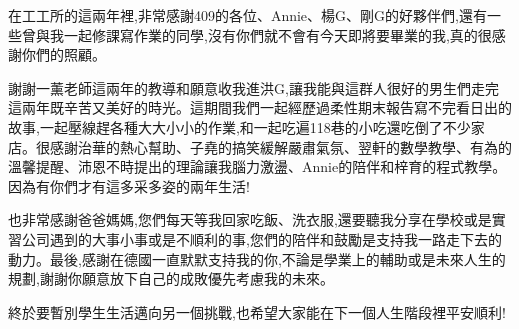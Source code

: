 \begin{acknowledgementszh}
在工工所的這兩年裡,非常感謝409的各位、Annie、楊G、剛G的好夥伴們,還有一些曾與我一起修課寫作業的同學,沒有你們就不會有今天即將要畢業的我,真的很感謝你們的照顧。

謝謝一薰老師這兩年的教導和願意收我進洪G,讓我能與這群人很好的男生們走完這兩年既辛苦又美好的時光。這期間我們一起經歷過柔性期末報告寫不完看日出的故事,一起壓線趕各種大大小小的作業,和一起吃遍118巷的小吃還吃倒了不少家店。很感謝治華的熱心幫助、子堯的搞笑緩解嚴肅氣氛、翌軒的數學教學、有為的溫馨提醒、沛恩不時提出的理論讓我腦力激盪、Annie的陪伴和梓育的程式教學。因為有你們才有這多采多姿的兩年生活!

也非常感謝爸爸媽媽,您們每天等我回家吃飯、洗衣服,還要聽我分享在學校或是實習公司遇到的大事小事或是不順利的事,您們的陪伴和鼓勵是支持我一路走下去的動力。最後,感謝在德國一直默默支持我的你,不論是學業上的輔助或是未來人生的規劃,謝謝你願意放下自己的成敗優先考慮我的未來。

終於要暫別學生生活邁向另一個挑戰,也希望大家能在下一個人生階段裡平安順利!

\end{acknowledgementszh}

